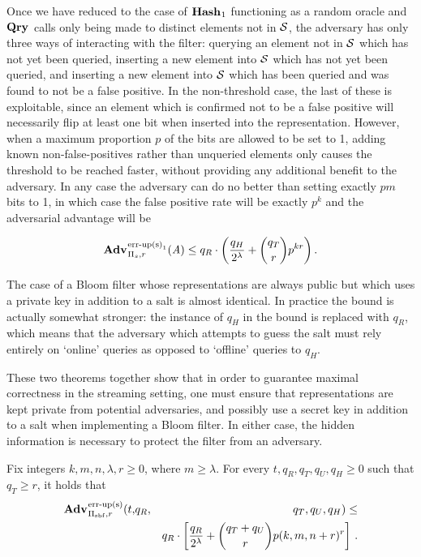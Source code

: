 
Once we have reduced to the case of $\mathbf{Hash}\hspace{0.5pt}_1$ functioning as a random oracle and $\mathbf{Qry}\hspace{0.5pt}$ calls only being made to distinct elements not in $\mathcal{S}$, the adversary has only three ways of interacting with the filter: querying an element not in $\mathcal{S}$ which has not yet been queried, inserting a new element into $\mathcal{S}$ which has not yet been queried, and inserting a new element into $\mathcal{S}$ which has been queried and was found to not be a false positive. In the non-threshold case, the last of these is exploitable, since an element which is confirmed not to be a false positive will necessarily flip at least one bit when inserted into the representation. However, when a maximum proportion $p$ of the bits are allowed to be set to 1, adding known non-false-positives rather than unqueried elements only causes the threshold to be reached faster, without providing any additional benefit to the adversary. In any case the adversary can do no better than setting exactly $pm$ bits to 1, in which case the false positive rate will be exactly $p^k$ and the adversarial advantage will be

$$\Adv{\erreps_1}_{\struct_s,r}(\advA) \le q_R \cdot \left(\frac{q_H}{2^\lambda} + \binom{q_T}{r}p^{kr}\right).$$

The case of a Bloom filter whose representations are always public but which uses a private key in addition to a salt is almost identical. In practice the bound is actually somewhat stronger: the instance of $q_H$ in the bound is replaced with $q_R$, which means that the adversary which attempts to guess the salt must rely entirely on `online' queries as opposed to `offline' queries to $q_H$.

These two theorems together show that in order to guarantee maximal correctness in the streaming setting, one must ensure that representations are kept private from potential adversaries, and possibly use a secret key in addition to a salt when implementing a Bloom filter. In either case, the hidden information is necessary to protect the filter from an adversary.

\begin{theorem}\label{thm:bf-key-bound}
Fix integers $k, m, n, \lambda, r\geq 0$, where $m \geq \lambda$.
  For every $t, q_R, q_T, q_U, q_H \geq 0$ such that $q_T \geq r$, it holds that
  \begin{eqnarray*}
    \Adv{\erreps}_{\struct_\saltybloom,r}(t,&q_R,& q_T, q_U, q_H) \leq \\ && q_R \cdot
     \left[
      \frac{q_R}{2^\lambda} +
      {\dbinom{q_T+q_U}{r}} p(k, m, n+r)^r
    \right] \,.
  \end{eqnarray*}
\end{theorem}

